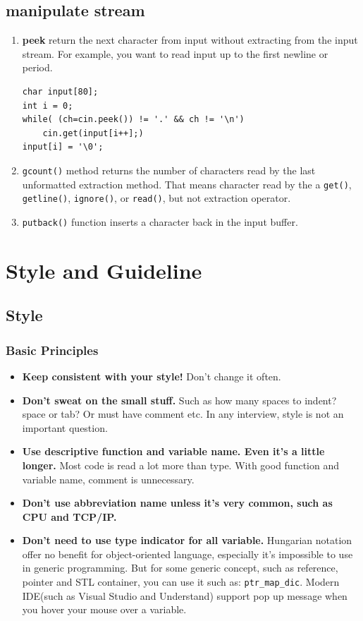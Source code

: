\documentclass[a4paper,11pt,twoside]{book}
\begin{document}
\section{manipulate stream}
\begin{enumerate}
	\item \textbf{peek} return the next character from input without extracting from the input stream. For example, you want to read input up to the first newline or period.
\begin{lstlisting}[numbers=none]
char input[80];
int i = 0;
while( (ch=cin.peek()) != '.' && ch != '\n')
	cin.get(input[i++];)
input[i] = '\0';
\end{lstlisting}
	
	\item \texttt{gcount()} method returns the number of characters read by the last unformatted extraction method. That means character read by the a \texttt{get()}, \texttt{getline()}, \texttt{ignore()}, or \texttt{read()}, but not extraction operator.
	
	\item \texttt{putback()} function inserts a character back in the input buffer.
\end{enumerate}


\chapter{Style and Guideline}


\section{Style}
\subsection{Basic Principles}
\begin{itemize}
	\item \textbf{Keep consistent with your style!} Don't change it often.
	
	\item \textbf{Don't sweat on the small stuff.} Such as how many spaces to indent? space or tab? Or must have comment etc. In any interview, style is not an important question.
	
	\item \textbf{Use descriptive function and variable name. Even it's a little longer.} Most code is read a lot more than type. With good function and variable name, comment is unnecessary.
	
	\item \textbf{Don't use abbreviation name unless it's very common, such as CPU and TCP/IP.}
	
	\item \textbf{Don't need to use type indicator for all variable.} Hungarian notation offer no benefit for object-oriented language, especially it's impossible to use in generic programming. But for some generic concept, such as reference, pointer and STL container, you can use it such as: \texttt{ptr\_map\_dic}. Modern IDE(such as Visual Studio and Understand) support pop up message when you hover your mouse over a variable.
\end{itemize}
\end{document}
